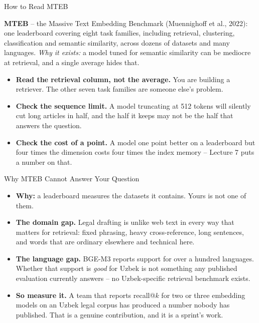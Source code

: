 \begin{frame}{How to Read MTEB}
\begin{rldefinition}
\textbf{MTEB} -- the Massive Text Embedding Benchmark (Muennighoff et al., 2022): one leaderboard covering eight task families, including retrieval, clustering, classification and semantic similarity, across dozens of datasets and many languages. \emph{Why it exists:} a model tuned for semantic similarity can be mediocre at retrieval, and a single average hides that.
\end{rldefinition}
\pause
\begin{itemize}
  \item \textbf{Read the retrieval column, not the average.} You are building a retriever. The other seven task families are someone else's problem.
  \pause
  \item \textbf{Check the sequence limit.} A model truncating at 512 tokens will silently cut long articles in half, and the half it keeps may not be the half that answers the question.
  \pause
  \item \textbf{Check the cost of a point.} A model one point better on a leaderboard but four times the dimension costs four times the index memory -- Lecture 7 puts a number on that.
\end{itemize}
\end{frame}

\begin{frame}{Why MTEB Cannot Answer Your Question}
\begin{itemize}
  \item \textbf{Why:} a leaderboard measures the datasets it contains. Yours is not one of them.
  \pause
  \item \textbf{The domain gap.} Legal drafting is unlike web text in every way that matters for retrieval: fixed phrasing, heavy cross-reference, long sentences, and words that are ordinary elsewhere and technical here.
  \pause
  \item \textbf{The language gap.} BGE-M3 reports support for over a hundred languages. Whether that support is \emph{good} for Uzbek is not something any published evaluation currently answers -- no Uzbek-specific retrieval benchmark exists.
  \pause
  \item \textbf{So measure it.} A team that reports recall@$k$ for two or three embedding models on an Uzbek legal corpus has produced a number nobody has published. That is a genuine contribution, and it is a sprint's work.
\end{itemize}
\end{frame}

